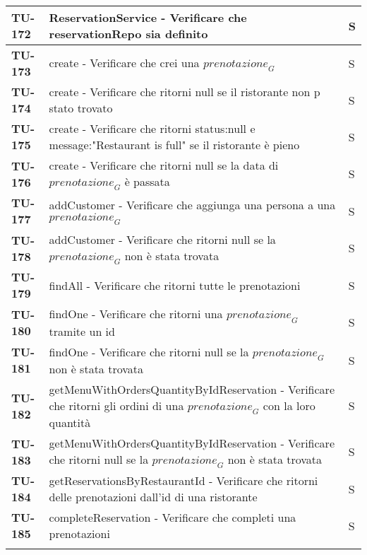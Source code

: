\begin{longtable}{|>{\centering\arraybackslash}p{2cm}|p{15cm}|p{1cm}|}
  \hline
  \rowcolor{gray!10}
  \textbf{TU-172} & ReservationService - Verificare che reservationRepo sia definito & S \\ 
  \hline
  \rowcolor{gray!10}
  \textbf{TU-173} & create - Verificare che crei una $\textit{prenotazione}_G$ & S \\ 
  \hline
  \rowcolor{gray!10}
  \textbf{TU-174} & create - Verificare che ritorni null se il ristorante non p stato trovato & S \\ 
  \hline
  \rowcolor{gray!10}
  \textbf{TU-175} & create - Verificare che ritorni status:null e message:"Restaurant is full" se il ristorante è pieno & S \\ 
  \hline
  \rowcolor{gray!10}
  \textbf{TU-176} & create - Verificare che ritorni null se la data di $\textit{prenotazione}_G$ è passata & S \\ 
  \hline
  \rowcolor{gray!10}
  \textbf{TU-177} & addCustomer - Verificare che aggiunga una persona a una $\textit{prenotazione}_G$ & S \\ 
  \hline
  \rowcolor{gray!10}
  \textbf{TU-178} & addCustomer - Verificare che ritorni null se la $\textit{prenotazione}_G$ non è stata trovata & S \\ 
  \hline
  \rowcolor{gray!10}
  \textbf{TU-179} & findAll - Verificare che ritorni tutte le prenotazioni & S \\ 
  \hline
  \rowcolor{gray!10}
  \textbf{TU-180} & findOne - Verificare che ritorni una $\textit{prenotazione}_G$ tramite un id & S \\ 
  \hline
  \rowcolor{gray!10}
  \textbf{TU-181} & findOne - Verificare che ritorni null se la $\textit{prenotazione}_G$ non è stata trovata & S \\ 
  \hline
  \rowcolor{gray!10}
  \textbf{TU-182} & getMenuWithOrdersQuantityByIdReservation - Verificare che ritorni gli ordini di una $\textit{prenotazione}_G$ con la loro quantità  & S \\ 
  \hline
  \rowcolor{gray!10}
  \textbf{TU-183} & getMenuWithOrdersQuantityByIdReservation - Verificare che ritorni null se la $\textit{prenotazione}_G$ non è stata trovata & S \\ 
  \hline
  \rowcolor{gray!10}
  \textbf{TU-184} & getReservationsByRestaurantId - Verificare che ritorni delle prenotazioni dall'id di una ristorante & S \\ 
  \hline
  \rowcolor{gray!10}
  \textbf{TU-185} & completeReservation - Verificare che completi una prenotazioni & S \\ 
  \hline
  \rowcolor{gray!10}

\end{longtable}
